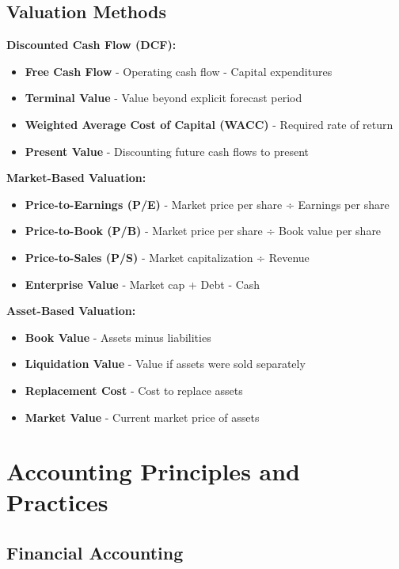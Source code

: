 \documentclass[12pt]{article}
\begin{document}
\subsection{Valuation Methods}

\textbf{Discounted Cash Flow (DCF):}
\begin{itemize}
    \item \textbf{Free Cash Flow} - Operating cash flow - Capital expenditures
    \item \textbf{Terminal Value} - Value beyond explicit forecast period
    \item \textbf{Weighted Average Cost of Capital (WACC)} - Required rate of return
    \item \textbf{Present Value} - Discounting future cash flows to present
\end{itemize}

\textbf{Market-Based Valuation:}
\begin{itemize}
    \item \textbf{Price-to-Earnings (P/E)} - Market price per share ÷ Earnings per share
    \item \textbf{Price-to-Book (P/B)} - Market price per share ÷ Book value per share
    \item \textbf{Price-to-Sales (P/S)} - Market capitalization ÷ Revenue
    \item \textbf{Enterprise Value} - Market cap + Debt - Cash
\end{itemize}

\textbf{Asset-Based Valuation:}
\begin{itemize}
    \item \textbf{Book Value} - Assets minus liabilities
    \item \textbf{Liquidation Value} - Value if assets were sold separately
    \item \textbf{Replacement Cost} - Cost to replace assets
    \item \textbf{Market Value} - Current market price of assets
\end{itemize}

\section{Accounting Principles and Practices}

\subsection{Financial Accounting}
\end{document}
